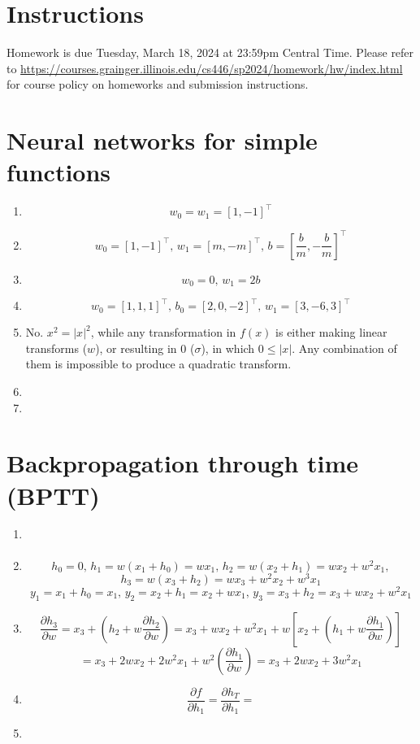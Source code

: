 \documentclass[12pt]{article}
\begin{document}
\singlespacing

\renewcommand{\familydefault}{\rmdefault}


\section{Instructions}

Homework is due Tuesday, March 18, 2024 at 23:59pm Central Time.
Please refer to \url{https://courses.grainger.illinois.edu/cs446/sp2024/homework/hw/index.html} for course policy on homeworks and submission instructions.

\section{Neural networks for simple functions}
\begin{enumerate}
    \item   \[w_0 = w_1 = [1, -1]^{\top}\]
    \item   \[w_0 = [1, -1]^{\top}, \, w_1 = [m, -m]^{\top}, \, b = [\frac{b}{m}, -\frac{b}{m}]^{\top}\]
    \item   \[w_0 = 0, \, w_1 = 2b\]
    \item   \[w_0 = [1, 1, 1]^{\top}, \, b_0 = [2, 0,-2]^{\top}, \, w_1 = [3, -6, 3]^{\top}\]
    \item   No. $x^2 = |x|^2$, while any transformation in $f(x)$ is either making linear transforms ($w$), or resulting in 0 ($\sigma$), in which $0 \leq |x|$. Any combination of them is impossible to produce a quadratic transform.
    \item   
    \item 
\end{enumerate}
\newpage

\section{Backpropagation through time (BPTT)}
\begin{enumerate}
    \item \begin{figure}[!htb]
        
    \end{figure}
    \item   \[h_0 = 0, \, h_1 = w(x_1 + h_0) = wx_1, \, h_2 = w(x_2 + h_1) = wx_2 + w^2x_1,\] 
    \[h_3 = w(x_3 + h_2) = wx_3 + w^2x_2 + w^3x_1\]
    \[y_1 = x_1 + h_0 = x_1, \, y_2 = x_2 + h_1 = x_2 + wx_1, \, y_3 = x_3 + h_2 = x_3 + wx_2 + w^2x_1\]
    \item    \[\frac{\partial h_3}{\partial w} = x_3 + (h_2 + w\frac{\partial h_2}{\partial w}) = x_3 + wx_2 + w^2x_1 + w[x_2 + (h_1 + w\frac{\partial h_1}{\partial w})]\] 
    \[= x_3 + 2wx_2 + 2w^2x_1 + w^2(\frac{\partial h_1}{\partial w}) = x_3 + 2wx_2 + 3w^2x_1\]
    \item    \[\frac{\partial f}{\partial h_1} = \frac{\partial h_T}{\partial h_1} = \]
    \item    \[\]
\end{enumerate}
\newpage
\end{document}
